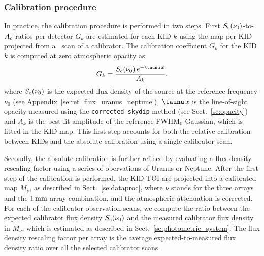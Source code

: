 \subsubsection{Calibration procedure}
\label{se:practical_calib}

{\lp In practice, the calibration procedure is performed in two steps. First
$S_{\rm{c}}(\nu_{0})$-to-$A_{\rm{c}}$ ratios per detector $G_k$
are estimated for each KID $k$ using the map per KID projected from
a \bm\ scan of a calibrator. The calibration coefficient $G_k$
for the KID $k$ is computed at zero atmospheric opacity as:
\begin{equation}
  G_k = \frac{S_{\rm{c}}(\nu_0)\, e^{-\taunu\,x}}{A_k},
  \label{eq:kid_gain}
\end{equation}
where $S_{\rm{c}}(\nu_0)$ is the expected flux density of the source at
the reference frequency $\nu_0$ (see
Appendix~\ref{se:ref_flux_uranus_neptune}), $\taunu\, x$ is the
line-of-sight opacity measured using the {\tt corrected skydip} method
(see Sect.~\ref{se:opacity}) and $A_k$ is the best-fit
amplitude of the reference FWHM$_0$ Gaussian, which is fitted in the
KID map. %
This first step accounts for both the relative calibration between KIDs and the absolute
calibration using a single calibrator scan.

Secondly, the absolute calibration is further refined by evaluating a
flux density rescaling factor using a series of obervations of
Uranus or Neptune. After the first step of the calibration is
performed, the KID TOI are projected into a calibrated map $M_\nu$, as
described in Sect.~\ref{se:dataproc}, where $\nu$ stands for the three
arrays and the $1\,\rm{mm}$-array combination, and the atmospheric attenuation
is corrected. For each of the calibrator observation scans, we
compute the ratio between the expected calibrator flux density
$S_{\rm{c}}(\nu_{0})$ and the measured calibrator flux density in $M_\nu$, which
is estimated as described in Sect.~\ref{se:photometric_system}. The
flux density rescaling factor per array is the average
expected-to-measured flux density ratio over all the selected calibrator scans.} 

%

